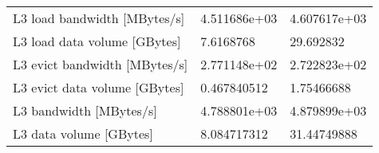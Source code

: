 \documentclass[12pt]{article}
\begin{document}
\begin{table}
\begin{tabular}{l|l|l}
\hline
  L3 load bandwidth [MBytes/s] & 4.511686e+03 & 4.607617e+03 \\
  L3 load data volume [GBytes] &   7.6168768  &   29.692832  \\
 L3 evict bandwidth [MBytes/s] & 2.771148e+02 & 2.722823e+02 \\
 L3 evict data volume [GBytes] &  0.467840512 &  1.75466688  \\
    L3 bandwidth [MBytes/s]    & 4.788801e+03 & 4.879899e+03 \\
    L3 data volume [GBytes]    &  8.084717312 &  31.44749888 \\
\hline
\hline
\end{tabular}
\end{table}



\end{document}
